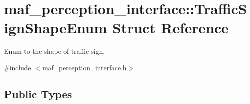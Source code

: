 \hypertarget{structmaf__perception__interface_1_1TrafficSignShapeEnum}{}\section{maf\+\_\+perception\+\_\+interface\+:\+:Traffic\+Sign\+Shape\+Enum Struct Reference}
\label{structmaf__perception__interface_1_1TrafficSignShapeEnum}


Enum to the shape of traffic sign.  




{\ttfamily \#include $<$maf\+\_\+perception\+\_\+interface.\+h$>$}

\subsection*{Public Types}
